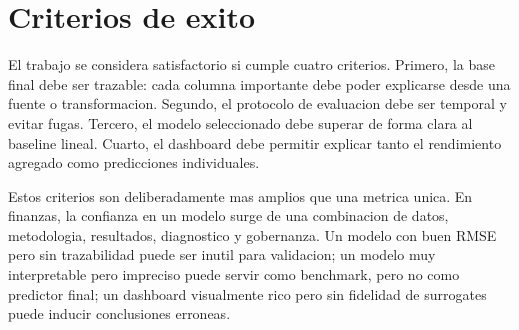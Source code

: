 \section{Criterios de exito}

El trabajo se considera satisfactorio si cumple cuatro criterios. Primero, la base final debe ser trazable: cada columna importante debe poder explicarse desde una fuente o transformacion. Segundo, el protocolo de evaluacion debe ser temporal y evitar fugas. Tercero, el modelo seleccionado debe superar de forma clara al baseline lineal. Cuarto, el dashboard debe permitir explicar tanto el rendimiento agregado como predicciones individuales.

Estos criterios son deliberadamente mas amplios que una metrica unica. En finanzas, la confianza en un modelo surge de una combinacion de datos, metodologia, resultados, diagnostico y gobernanza. Un modelo con buen RMSE pero sin trazabilidad puede ser inutil para validacion; un modelo muy interpretable pero impreciso puede servir como benchmark, pero no como predictor final; un dashboard visualmente rico pero sin fidelidad de surrogates puede inducir conclusiones erroneas.
